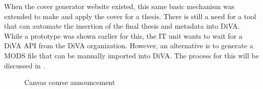 When the cover generator website existed, this same basic mechanism was extended to make and apply the cover for a thesis. There is still a need for a tool that can automate the insertion of the final thesis and metadata into DiVA. While a prototype was shown earlier for this, the IT unit wants to wait for a DiVA API from the DiVA organization. However, an alternative is to generate a MODS file that can be manually imported into DiVA. The process for this will be discussed in .
\clearpage
\begin{figure}[!ht]
  \begin{center}
  \end{center}
  \caption{Canvas course announcement}
  \label{fig:canvasCourseAnnouncement}
\end{figure}

